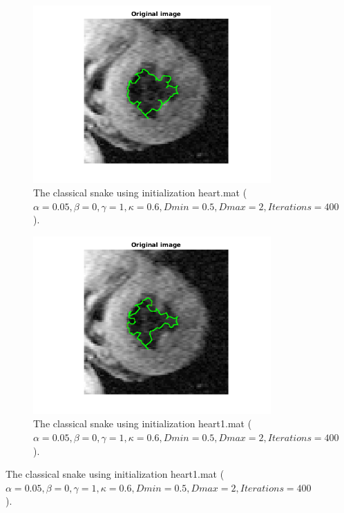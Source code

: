 \documentclass{article}
\begin{document}
\begin{figure}[H]
\centering
\begin{subfigure}{0.49\textwidth}
  \centering
  \includegraphics[width=\linewidth]{fig6a.png}
  \caption{The classical snake using initialization heart.mat ($\alpha=0.05, \beta=0, \gamma=1,\kappa=0.6,Dmin=0.5,Dmax=2, Iterations=400$).}
  \label{fig6a}
\end{subfigure}
\begin{subfigure}{0.49\textwidth}
  \centering
  \includegraphics[width=\linewidth]{fig6b.png}
  \caption{The classical snake using initialization heart1.mat ($\alpha=0.05, \beta=0, \gamma=1,\kappa=0.6,Dmin=0.5,Dmax=2, Iterations=400$).}
  \label{fig6b}
\end{subfigure}

\end{figure}
\end{document}
